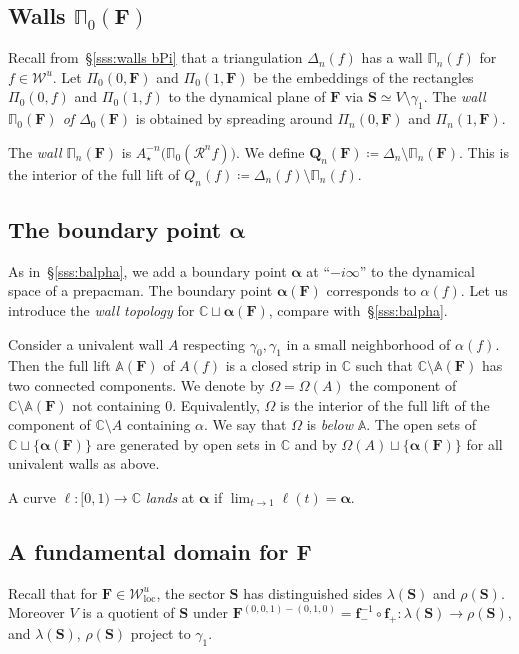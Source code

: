 \documentclass{amsart}
\newcommand{\1}{{\mathbb 1 }}
\newcommand{\bDelta}{{\mathbb{\Delta}}}
\newcommand{\bPi}{{\mathbb{\Pi}}}
\newcommand{\bA}{{\mathbb{A}}}
\newcommand\RR{\mathcal{R}}
\newcommand{\bF}{{\mathbf F}}
\newcommand{\bQ}{{\mathbf Q}}
\newcommand{\bS}{{\mathbf S}}
\newcommand{\bbf}{{\mathbf f}}
\newcommand{\str}{{\star}}
\newcommand\inn{{\Omega}}
\newcommand\binn{{\mathbb \inn}}
\def\loc{{\mathrm{loc}}}
\newcommand\WW{\mathcal{W}}
\newcommand\UnstLoc{{\boldsymbol{\mathcal{W}}^u_\loc}}
\newcommand{\C}{\mathbb{C}}
\theoremstyle{remark}
\numberwithin{equation}{section}
\theoremstyle{definition}
\newcommand{\balpha}{{\boldsymbol \alpha}}
\theoremstyle{nonumberbreak}
\begin{document}
\subsection{Walls $\bPi_0(\bF)$}
\label{ss:MP:walls}
Recall from~\S\ref{sss:walls bPi} that a triangulation $\bDelta_n(f)$ has a wall $\bPi_n(f)$ for $f\in \WW^u$. Let $\Pi_0(0,\bF)$ and $\Pi_0(1,\bF)$ be the embeddings of the rectangles  $\Pi_0(0,f)$ and $\Pi_0(1,f)$ to the dynamical plane of $\bF$ via $\bS\simeq V\setminus \gamma_1$. The \emph{wall $\bPi_0(\bF)$ of $\bDelta_0(\bF)$} is obtained by spreading around $\Pi_n(0,\bF)$ and $\Pi_n(1,\bF)$.

The \emph{wall $\bPi_n(\bF)$} is $A_\str^{-n} \big(\bPi_0(\RR^n f)\big)$. We define $\bQ_n(\bF)\coloneqq \bDelta_n\setminus \bPi_n(\bF)$. This is the interior of the full lift of $Q_n(f)\coloneqq \bDelta_n( f)\setminus \bPi_n(f)$.



\subsection{The boundary point $\balpha$}
\label{ss:balpha:wall topoloy}
As in~\S\ref{sss:balpha}, we add a boundary point $\balpha$ at ``$-i \infty$'' to the dynamical space of a prepacman. The boundary point $\balpha(\bF)$ corresponds to $\alpha(f)$. Let us introduce the \emph{wall topology} for $\C\sqcup \balpha(\bF)$, compare with~\S\ref{sss:balpha}.

Consider a univalent wall $A$ respecting $\gamma_0,\gamma_1$ in a small neighborhood of $\alpha(f)$. Then the full lift $\bA(\bF)$ of $A(f)$ is a closed strip in $\C$ such that $\C\setminus \bA(\bF)$ has two connected components. We denote by $\binn=\binn(A)$ the component of $\C\setminus \bA(\bF)$ not containing $0$. Equivalently, $\binn$ is the interior of the full lift of the component of $\C\setminus A$ containing $\alpha$. We say that $\binn$ is \emph{below} $\bA$. The open sets of $\C\sqcup \{\balpha(\bF)\}$ are generated by open sets in $\C$ and by $\binn(A) \sqcup \{\balpha(\bF)\}$ for all univalent walls as above. 
 
 A curve $\ell\colon [0,1)\to \C$ \emph{lands} at $\balpha$ if $\lim _{t\to 1} \ell(t)=\balpha$.
\subsection{A fundamental domain for $\bF$}
\label{ss:fund domain for bF}Recall that for $\bF\in \UnstLoc$, the sector $\bS$ has distinguished sides $\lambda (\bS)$ and $\rho(\bS)$. Moreover $V$ is a quotient of $\bS$ under $\bF^{(0,0,1)-(0,1,0)}=\bbf_-^{-1}\circ \bbf_+\colon \lambda(\bS)\to \rho(\bS)$, and $\lambda (\bS)$, $\rho(\bS)$ project to $\gamma_1$. 
\end{document}
